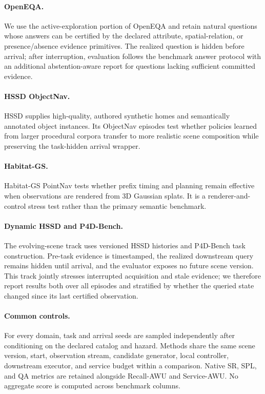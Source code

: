 \paragraph{OpenEQA.}
We use the active-exploration portion of OpenEQA and retain natural questions whose answers can be certified by the declared attribute, spatial-relation, or presence/absence evidence primitives.
The realized question is hidden before arrival; after interruption, evaluation follows the benchmark answer protocol with an additional abstention-aware report for questions lacking sufficient committed evidence.

\paragraph{HSSD ObjectNav.}
HSSD supplies high-quality, authored synthetic homes and semantically annotated object instances.
Its ObjectNav episodes test whether policies learned from larger procedural corpora transfer to more realistic scene composition while preserving the task-hidden arrival wrapper.

\paragraph{Habitat-GS.}
Habitat-GS PointNav tests whether prefix timing and planning remain effective when observations are rendered from 3D Gaussian splats.
It is a renderer-and-control stress test rather than the primary semantic benchmark.

\paragraph{Dynamic HSSD and P4D-Bench.}
The evolving-scene track uses versioned HSSD histories and P4D-Bench task construction.
Pre-task evidence is timestamped, the realized downstream query remains hidden until arrival, and the evaluator exposes no future scene version.
This track jointly stresses interrupted acquisition and stale evidence; we therefore report results both over all episodes and stratified by whether the queried state changed since its last certified observation.

\paragraph{Common controls.}
For every domain, task and arrival seeds are sampled independently after conditioning on the declared catalog and hazard.
Methods share the same scene version, start, observation stream, candidate generator, local controller, downstream executor, and service budget within a comparison.
Native SR, SPL, and QA metrics are retained alongside Recall-AWU and Service-AWU.
No aggregate score is computed across benchmark columns.

